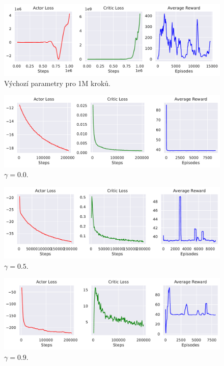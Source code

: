 \begin{figure}[ht]
  \centering
  \includegraphics[width=\linewidth]{images/exp-hopper-1M.pdf}
  \caption{Výchozí parametry pro 1M kroků.}
\end{figure}

\begin{figure}[ht]
  \centering
  \includegraphics[width=\linewidth]{images/exp-gamma0.0.pdf}
  \caption{$\gamma=0.0$.}
\end{figure}

\begin{figure}[ht]
  \centering
  \includegraphics[width=\linewidth]{images/exp-gamma0.5.pdf}
  \caption{$\gamma=0.5$.}
\end{figure}

\begin{figure}[ht]
  \centering
  \includegraphics[width=\linewidth]{images/exp-gamma0.9.pdf}
  \caption{$\gamma=0.9$.}
\end{figure}

